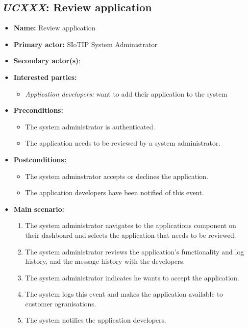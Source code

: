 \subsection{\emph{UCXXX}: Review application}
\begin{itemize}
    \item \textbf{Name:} Review application
    \item \textbf{Primary actor:} SIoTIP System Administrator
    \item \textbf{Secondary actor(s)}:
    \item \textbf{Interested parties:}
        \begin{itemize}
            \item \textit{Application developers:} want to add their application to the system
        \end{itemize}

    \item \textbf{Preconditions:}
        \begin{itemize}
            \item The system administrator is authenticated.
            \item The application needs to be reviewed by a system administrator.
        \end{itemize}

    \item \textbf{Postconditions:}
        \begin{itemize}
            \item The system adminstrator accepts or declines the application.
            \item The application developers have been notified of this event.
        \end{itemize}

    \item \textbf{Main scenario:}
        \begin{enumerate}
            \item The system administrator navigates to the applications component on their
                  dashboard and selects the application that needs to be reviewed.
            \item The system administrator reviews the application's functionality and
                  log history, and the message history with the developers.
            \item The system administrator indicates he wants to accept the application.
            \item The system logs this event and makes the application available to
                  customer ogranisations.
            \item The system notifies the application developers.
        \end{enumerate}


\end{itemize}
